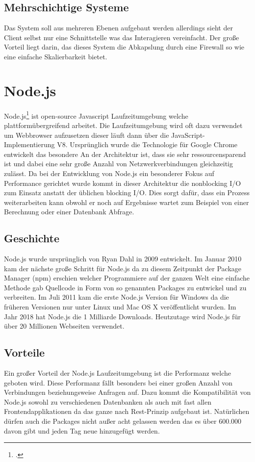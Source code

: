 		 	\subsection{Mehrschichtige Systeme}
				Das System soll aus mehreren Ebenen aufgebaut werden allerdings sieht der Client selbst nur eine Schnittstelle was das Interagieren vereinfacht. Der große Vorteil liegt darin, das dieses System die Abkapslung durch eine Firewall so wie eine einfache Skalierbarkeit bietet.		 	
		 \section{Node.js}
		 	Node.js\footcite{nodejs} ist open-source Javascript Laufzeitumgebung welche plattformübergreifend arbeitet. Die Laufzeitumgebung wird oft dazu verwendet um Webbrowser aufzusetzen dieser läuft dann über die JavaScript-Implementierung V8. Ursprünglich wurde die Technologie für Google Chrome entwickelt das besondere An der Architektur ist, dass sie sehr ressourcensparend ist und dabei eine sehr große Anzahl von Netzwerkverbindungen gleichzeitig zulässt. Da bei der Entwicklung von Node.js ein besonderer Fokus auf Performance gerichtet wurde kommt in dieser Architektur die nonblocking I/O zum Einsatz anstatt der üblichen blocking I/O. Dies sorgt dafür, dass ein Prozess weiterarbeiten kann obwohl er noch auf Ergebnisse wartet zum Beispiel von einer Berechnung oder einer Datenbank Abfrage. 		 	
		 	\subsection{Geschichte}
		 		Node.js wurde ursprünglich von Ryan Dahl in 2009 entwickelt. Im Januar 2010 kam der nächste große Schritt für Node.js da zu diesem Zeitpunkt der Package Manager (npm) erschien welcher Programmiere auf der ganzen Welt eine einfache Methode gab Quellcode in Form von so genannten Packages zu entwickel und zu verbreiten. Im Juli 2011 kam die erste Node.js Version für Windows da die früheren Versionen nur unter Linux und Mac OS X veröffentlicht wurden. Im Jahr 2018 hat Node.js die 1 Milliarde Downloads. Heutzutage wird Node.js für über 20 Millionen Webseiten verwendet. 		 		
		 	\subsection{Vorteile}
		 		Ein großer Vorteil der Node.js Laufzeitumgebung ist die Performanz welche geboten wird. Diese Performanz fällt besonders bei einer großen Anzahl von Verbindungen beziehungsweise Anfragen auf. Dazu kommt die Kompatibilität von Node.js sowohl zu verschiedenen Datenbanken als auch mit fast allen Frontendapplikationen da das ganze nach Rest-Prinzip aufgebaut ist. Natürlichen dürfen auch die Packages nicht außer acht gelassen werden das es über 600.000 davon gibt und jeden Tag neue hinzugefügt werden.		 		
